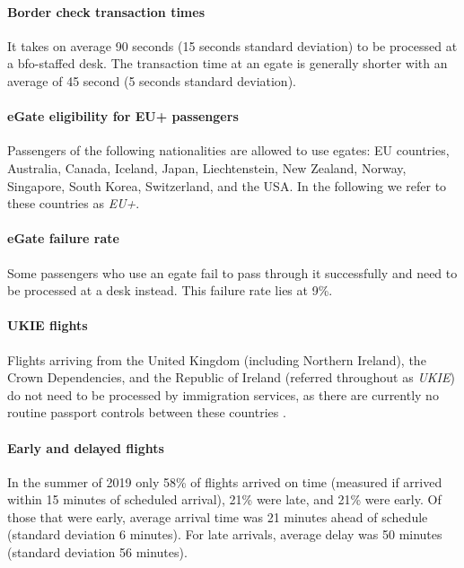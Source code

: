 \documentclass[10pt]{article}
\begin{document}
\paragraph{Border check transaction times} It takes on average 90 seconds (15 seconds standard deviation) to be processed at a \gls{bfo}-staffed desk. The transaction time at an \gls{egate} is generally shorter with an average of 45 second (5 seconds standard deviation). 

\paragraph{eGate eligibility for EU+ passengers}
Passengers of the following nationalities are allowed to use \glspl{egate}: EU countries, Australia, Canada, Iceland, Japan, Liechtenstein, New Zealand, Norway, Singapore, South Korea, Switzerland, and the USA. In the following we refer to these countries as \textit{EU+}. 

\paragraph{eGate failure rate}
Some passengers who use an \gls{egate} fail to pass through it successfully and need to be processed at a desk instead. This failure rate lies at 9\%.

\paragraph{UKIE flights} Flights arriving from the United Kingdom (including Northern Ireland), the Crown Dependencies, and the Republic of Ireland (referred throughout as \textit{UKIE}) do not need to be processed by immigration services, as there are currently no routine passport controls between these countries \cite{common_travel_area}.

\paragraph{Early and delayed flights}
In the summer of 2019 only 58\% of flights arrived on time (measured if arrived within 15 minutes of scheduled arrival), 21\% were late, and 21\% were early. Of those that were early, average arrival time was 21 minutes ahead of schedule (standard deviation 6 minutes). For late arrivals, average delay was 50 minutes (standard deviation 56 minutes). 
\end{document}
